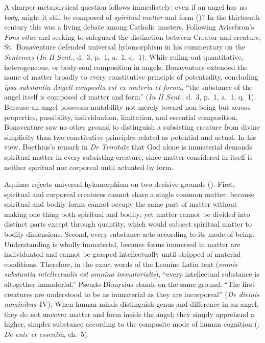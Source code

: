 A sharper metaphysical question follows immediately: even if an angel has no \emph{body}, might it still be composed of \emph{spiritual matter} and form ()? In the thirteenth century this was a living debate among Catholic masters. Following Avicebron's \emph{Fons vitae} and seeking to safeguard the distinction between Creator and creature, St.~Bonaventure defended universal hylomorphism in his commentary on the \emph{Sentences} (\emph{In II Sent.}, d.~3, p.~1, a.~1, q.~1). While ruling out quantitative, heterogeneous, or body-soul composition in angels, Bonaventure extended the name of matter broadly to every constitutive principle of potentiality, concluding \emph{ipsa substantia Angeli composita est ex materia et forma}, ``the substance of the angel itself is composed of matter and form'' (\emph{In II Sent.}, d.~3, p.~1, a.~1, q.~1). Because an angel possesses mutability not merely toward non-being but across properties, passibility, individuation, limitation, and essential composition, Bonaventure saw no other ground to distinguish a subsisting creature from divine simplicity than two constitutive principles related as potential and actual. In his view, Boethius's remark in \emph{De Trinitate} that God alone is immaterial demands spiritual matter in every subsisting creature, since matter considered in itself is neither spiritual nor corporeal until actuated by form.

Aquinas rejects universal hylomorphism on two decisive grounds (). First, spiritual and corporeal creatures cannot share a single common matter, because spiritual and bodily forms cannot occupy the same part of matter without making one thing both spiritual and bodily; yet matter cannot be divided into distinct parts except through quantity, which would subject spiritual matter to bodily dimensions. Second, every substance acts according to its mode of being. Understanding is wholly immaterial, because forms immersed in matter are individuated and cannot be grasped intellectually until stripped of material conditions. Therefore, in the exact words of the Leonine Latin text (\emph{omnis substantia intellectualis est omnino immaterialis}), ``every intellectual substance is altogether immaterial.'' Pseudo-Dionysius stands on the same ground: ``The first creatures are understood to be as immaterial as they are incorporeal'' (\emph{De divinis nominibus}~IV). When human minds distinguish genus and difference in an angel, they do not uncover matter and form inside the angel; they simply apprehend a higher, simpler substance according to the composite mode of human cognition (; \emph{De ente et essentia}, ch.~5).

